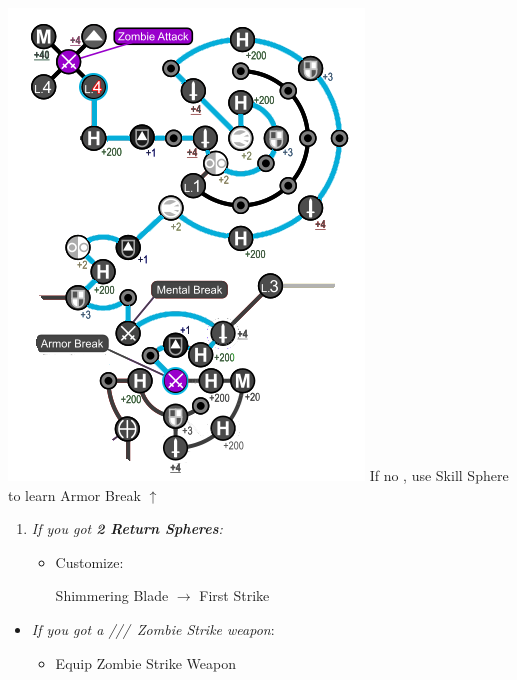\begin{spheregrid}
\begin{multicols}{2}
\begin{itemize}
			\includegraphics[width=.8\columnwidth]{graphics/Tidus_BFA}
			\rikkuf If no \od, use Skill Sphere to learn Armor Break $\uparrow$
		\end{itemize}
	\end{multicols}
\end{spheregrid}
\begin{enumerate}[resume]
    \item \textit{If you got \textbf{2 Return Spheres}:}
        \begin{itemize}
            \item Customize:
                \begin{itemize}
                    \auronf Shimmering Blade $\rightarrow$ First Strike
                \end{itemize}
        \end{itemize}
\end{enumerate}
\colstart
	\begin{equip}
		\begin{itemize}
			\item \textit{If you got a \lulu/\kimahri/\wakka/\rikku\ Zombie Strike weapon}:
				\begin{itemize}
					\item Equip Zombie Strike Weapon
				\end{itemize}
		\end{itemize}
	\end{equip}
